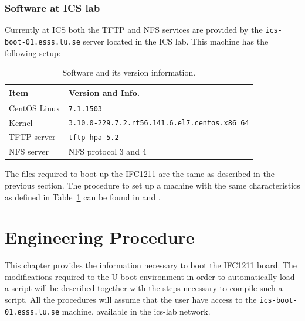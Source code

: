 \documentclass[11pt
  , a4paper
  , article
  , oneside
  , showtrims
]{memoir}
\begin{document}
\subsection{Software at ICS lab}
Currently at ICS both the TFTP and NFS services are provided by the \texttt{ics-boot-01.esss.lu.se} server located in the ICS lab. This machine has the following setup:
\begin{table}[!htb]
	\centering
	\begin{tabular}{l|l}
		\toprule\rowcolor{gray!15}
		Item                      & Version and Info.                                               \\\midrule
		CentOS Linux              & \texttt{7.1.1503}                                               \\\midrule
		Kernel                    & \texttt{3.10.0-229.7.2.rt56.141.6.el7.centos.x86\_64}           \\\midrule
		TFTP server               & \texttt{tftp-hpa 5.2}                                           \\\midrule
		NFS server                & NFS protocol 3 and 4                                            \\\bottomrule
	\end{tabular}
	\caption[]{Software and its version information.}
	\label{table:swlist_ics}
\end{table}

The files required to boot up the IFC1211 are the same as described in the previous section.
The procedure to set up a machine with the same characteristics as defined in Table~\ref{table:swlist_ics} can be found in \cite{SULI} and \cite{SETUP_LAB_INFRASTRUCTURE}.
\clearpage


\chapter{Engineering Procedure}

This chapter provides the information necessary to boot the IFC1211 board. The modifications required to the U-boot environment in order to automatically load a script will be described together with the steps necessary to compile such a script.
All the procedures will assume that the user have access to the \texttt{ics-boot-01.esss.lu.se} machine, available in the ics-lab network.
\end{document}
